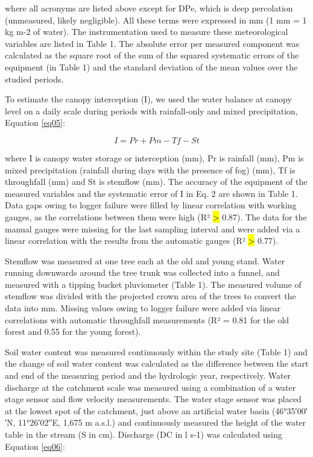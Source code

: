 \documentclass[10pt,letterpaper]{article}
\begin{document}
where all acronyms are listed above except for DPe, which is deep percolation (unmeasured, likely negligible). All these terms were expressed in mm (1 mm = 1 kg m-2 of water). The instrumentation used to measure these meteorological variables are listed in Table 1. The absolute error per measured component was calculated as the square root of the sum of the squared systematic errors of the equipment (in Table 1) and the standard deviation of the mean values over the studied periods.

To estimate the canopy interception (I), we used the water balance at canopy level on a daily scale during periods with rainfall-only and mixed precipitation, Equation \ref{eq05}:

\begin{equation}\label{eq05}
	I = Pr + Pm - Tf - St
\end{equation}

where I is canopy water storage or interception (mm), Pr is rainfall (mm), Pm is mixed precipitation (rainfall during days with the presence of fog) (mm), Tf is throughfall (mm) and St is stemflow (mm). The accuracy of the equipment of the measured variables and the systematic error of I in Eq. 2 are shown in Table 1. Data gaps owing to logger failure were filled by linear correlation with working gauges, as the correlations between them were high (R² \hl{\textgreater} 0.87). The data for the manual gauges were missing for the last sampling interval and were added via a linear correlation with the results from the automatic gauges (R² \hl{\textgreater} 0.77).

Stemflow was measured at one tree each at the old and young stand. Water running downwards around the tree trunk was collected into a funnel, and measured with a tipping bucket pluviometer (Table 1). The measured volume of stemflow was divided with the projected crown area of the trees to convert the data into mm. Missing values owing to logger failure were added via linear correlations with automatic throughfall measurements (R² = 0.81 for the old forest and 0.55 for the young forest). 

Soil water content was measured continuously within the study site (Table 1) and the change of soil water content was calculated as the difference between the start and end of the measuring period and the hydrologic year, respectively. Water discharge at the catchment scale was measured using a combination of a water stage sensor and flow velocity measurements. The water stage sensor was placed at the lowest spot of the catchment, just above an artificial water basin (46°35′00′′N, 11°26′02′′E, 1,675 m a.s.l.) and continuously measured the height of the water table in the stream (S in cm). Discharge (DC in l s-1) was calculated using Equation \ref{eq06}:
\end{document}
